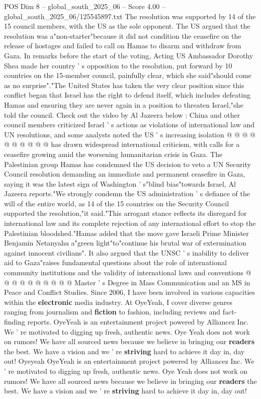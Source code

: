 \begin{textsample}{POS Dim 8 – global\_south\_2025\_06 – Score 4.00 – global\_south\_2025\_06/125545897.txt}  \label{ex:f8_pos_192}
The resolution was supported by 14 of the 15 council members, with the US as the sole opponent.
The US argued that the resolution was a"non-starter"because it did not condition the ceasefire on the release of hostages and failed to call on Hamas to disarm and withdraw from Gaza.
In remarks before the start of the voting, Acting US Ambassador Dorothy Shea made her country ' s opposition to the resolution, put forward by 10 countries on the 15-member council, painfully clear, which she said"should come as no surprise"."The United States has taken the very clear position since this conflict began that Israel has the right to defend itself, which includes defeating Hamas and ensuring they are never again in a position to threaten Israel,"she told the council.
Check out the video by Al Jazeera below : China and other council members criticized Israel ' s actions as violations of international law and UN resolutions, and some analysts noted the US ' s increasing isolation @ @ @ @ @ @ @ @ @ @ has drawn widespread international criticism, with calls for a ceasefire growing amid the worsening humanitarian crisis in Gaza.
The Palestinian group Hamas has condemned the US decision to veto a UN Security Council resolution demanding an immediate and permanent ceasefire in Gaza, saying it was the latest sign of Washington ' s"blind bias"towards Israel, Al Jazeera reports."We strongly condemn the US administration ' s defiance of the will of the entire world, as 14 of the 15 countries on the Security Council supported the resolution,"it said."This arrogant stance reflects its disregard for international law and its complete rejection of any international effort to stop the Palestinian bloodshed."Hamas added that the move gave Israeli Prime Minister Benjamin Netanyahu a"green light"to"continue his brutal war of extermination against innocent civilians".
It also argued that the UNSC ' s inability to deliver aid to Gaza"raises fundamental questions about the role of international community institutions and the validity of international laws and conventions @ @ @ @ @ @ @ @ @ @ Master ' s Degree in Mass Communication and an MS in Peace and Conflict Studies.
Since 2006, I have been involved in various capacities within the \textbf{electronic} media industry.
At OyeYeah, I cover diverse genres ranging from journalism and \textbf{fiction} to fashion, including reviews and fact-finding reports.
OyeYeah is an entertainment project powered by Alliancez Inc.
We ' re motivated to digging up fresh, authentic news.
Oye Yeah does not work on rumors!
We have all sourced news because we believe in bringing our \textbf{readers} the best.
We have a vision and we ' re \textbf{striving} hard to achieve it day in, day out!
Oyeyeah OyeYeah is an entertainment project powered by Alliancez Inc.
We ' re motivated to digging up fresh, authentic news.
Oye Yeah does not work on rumors!
We have all sourced news because we believe in bringing our \textbf{readers} the best.
We have a vision and we ' re \textbf{striving} hard to achieve it day in, day out!

\end{textsample}
